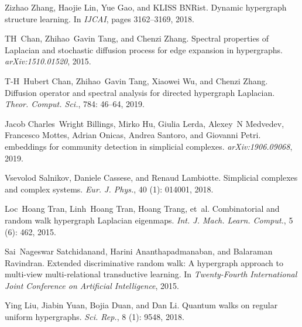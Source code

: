 Zizhao Zhang, Haojie Lin, Yue Gao, and KLISS BNRist.
\newblock Dynamic hypergraph structure learning.
\newblock In \emph{{{IJCAI}}}, pages 3162--3169, 2018.

TH~Chan, Zhihao~Gavin Tang, and Chenzi Zhang.
\newblock Spectral properties of {Laplacian} and stochastic diffusion process
for edge expansion in hypergraphs.
\newblock \emph{arXiv:1510.01520}, 2015.

T-H~Hubert Chan, Zhihao~Gavin Tang, Xiaowei Wu, and Chenzi Zhang.
\newblock Diffusion operator and spectral analysis for directed hypergraph
{{Laplacian}}.
\newblock \emph{Theor. Comput. Sci.}, 784: 46--64, 2019.

Jacob Charles~Wright Billings, Mirko Hu, Giulia Lerda, Alexey~N Medvedev,
Francesco Mottes, Adrian Onicas, Andrea Santoro, and Giovanni Petri.
 embeddings for community detection in simplicial
complexes.
\newblock \emph{arXiv:1906.09068}, 2019.

Vsevolod Salnikov, Daniele Cassese, and Renaud Lambiotte.
\newblock Simplicial complexes and complex systems.
\newblock \emph{Eur. J. Phys.}, 40 (1): 014001, 2018.

Loc~Hoang Tran, Linh~Hoang Tran, Hoang Trang, et~al.
\newblock Combinatorial and random walk hypergraph {Laplacian} eigenmaps.
\newblock \emph{Int. J. Mach. Learn. Comput.}, 5 (6): 462,
2015.

Sai~Nageswar Satchidanand, Harini Ananthapadmanaban, and Balaraman Ravindran.
\newblock Extended discriminative random walk: A hypergraph approach to
multi-view multi-relational transductive learning.
\newblock In \emph{Twenty-Fourth International Joint Conference on Artificial
    Intelligence}, 2015.

Ying Liu, Jiabin Yuan, Bojia Duan, and Dan Li.
\newblock Quantum walks on regular uniform hypergraphs.
\newblock \emph{Sci. Rep.}, 8 (1): 9548, 2018.

